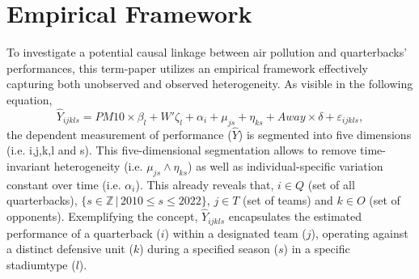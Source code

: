 \documentclass[12pt,a4paper]{article}
\begin{document}
\section{Empirical Framework}
\label{4}
To investigate a potential causal linkage between air pollution and quarterbacks' performances, this term-paper utilizes an empirical framework effectively capturing both unobserved and observed heterogeneity. As visible in the following equation,
\begin{equation}
\hat{Y}_{ijkls} = PM10 \times \beta_l + {W'} \zeta_l + \alpha_i + \mu_{js} + \eta_{ks} + Away \times \delta + \varepsilon_{ijkls},
\end{equation}
the dependent measurement of performance ($\hat{Y}$) is segmented into five dimensions (i.e. i,j,k,l and s). This five-dimensional segmentation allows to remove time-invariant heterogeneity (i.e. $ \mu_{js} \wedge \eta_{ks}$) as well as individual-specific variation constant over time (i.e. $\alpha_i$). This already reveals that, $i \in Q$ (set of all quarterbacks), $\{s \in \mathbb{Z} \, | \, 2010 \leq s \leq 2022\}$, $j \in T$ (set of teams) and $k \in O$ (set of opponents). Exemplifying the concept, $\hat{Y}_{ijkls}$ encapsulates the estimated performance of a quarterback ($i$) within a designated team ($j$), operating against a distinct defensive unit ($k$) during a specified season ($s$) in a specific stadiumtype ($l$). 
\end{document}
